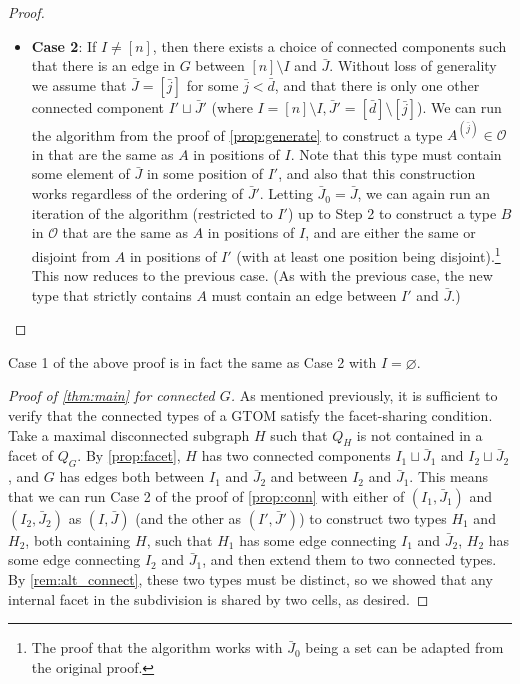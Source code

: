 \documentclass[letterpaper,reqno,11pt]{amsart}
\begin{document}
\begin{proof}
\begin{itemize}
        \item \textbf{Case 2}: If $I \neq [n]$, then there exists a choice of connected components such that there is an edge in $G$ between $[n]\setminus I$ and $\bar{J}$. Without loss of generality we assume that $\bar{J} = [\bar{j}]$ for some $\bar{j} < \bar{d}$, and that there is only one other connected component $I'\sqcup \bar{J}'$ (where $I = [n]\setminus I, \bar{J}' = [\bar{d}]\setminus [\bar{j}]$). We can run the algorithm from the proof of \cref{prop:generate} to construct a type $A^{(\bar{j})}\in \mathcal{O}$ in that are the same as $A$ in positions of $I$. Note that this type must contain some element of $\bar{J}$ in some position of $I'$, and also that this construction works regardless of the ordering of $\bar{J}'$. Letting $\bar{J}_0 = \bar{J}$, we can again run an iteration of the algorithm (restricted to $I'$) up to Step 2 to construct a type $B$ in $\mathcal{O}$ that are the same as $A$ in positions of $I$, and are either the same or disjoint from $A$ in positions of $I'$ (with at least one position being disjoint).\footnote{The proof that the algorithm works with $\bar{J}_0$ being a set can be adapted from the original proof.} This now reduces to the previous case. (As with the previous case, the new type that strictly contains $A$ must contain an edge between $I'$ and $\bar{J}$.)
    \end{itemize}
\end{proof}

\begin{remark}
    Case 1 of the above proof is in fact the same as Case 2 with $I = \varnothing$.
\end{remark}

\begin{proof}[Proof of \cref{thm:main} for connected $G$]
    As mentioned previously, it is sufficient to verify that the connected types of a GTOM satisfy the facet-sharing condition. Take a maximal disconnected subgraph $H$ such that $Q_H$ is not contained in a facet of $Q_G$. By \cref{prop:facet}, $H$ has two connected components $I_1\sqcup \bar{J}_1$ and $I_2\sqcup \bar{J}_2$, and $G$ has edges both between $I_1$ and $\bar{J}_2$ and between $I_2$ and $\bar{J}_1$. This means that we can run Case 2 of the proof of \cref{prop:conn} with either of $(I_1, \bar{J}_1)$ and $(I_2, \bar{J}_2)$ as $(I, \bar{J})$ (and the other as $(I', \bar{J}')$) to construct two types $H_1$ and $H_2$, both containing $H$, such that $H_1$ has some edge connecting $I_1$ and $\bar{J}_2$, $H_2$ has some edge connecting $I_2$ and $\bar{J}_1$, and then extend them to two connected types. By \cref{rem:alt_connect}, these two types must be distinct, so we showed that any internal facet in the subdivision is shared by two cells, as desired.
\end{proof}
\end{document}

